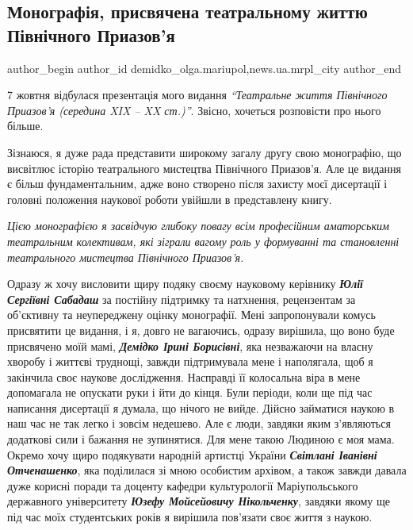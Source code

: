  
 
 
 
 
 
\subsection{Монографія, присвячена театральному життю Північного Приазов'я}
\label{sec:06_10_2021.stz.news.ua.mrpl_city.1.monografia}
 
\ifcmt
 author_begin
   author_id demidko_olga.mariupol,news.ua.mrpl_city
 author_end
\fi


7 жовтня відбулася презентація мого видання \emph{\enquote{Театральне життя Північного
Приазов'я (середина XIX – XX ст.)}}. Звісно, хочеться розповісти про нього
більше.

Зізнаюся, я дуже рада представити широкому загалу другу свою монографію, що
висвітлює історію театрального мистецтва Північного Приазов'я. Але це видання є
більш фундаментальним, адже воно створено після захисту моєї дисертації і
головні положення наукової роботи увійшли в представлену книгу.

\emph{Цією монографією я засвідчую глибоку повагу всім професійним  аматорським
театральним колективам, які зіграли вагому роль у формуванні та становленні
театрального мистецтва Північного Приазов'я.}

Одразу ж хочу висловити щиру подяку своєму науковому керівнику \emph{\textbf{Юлії Сергіївні
Сабадаш}} за постійну підтримку та натхнення, рецензентам за об'єктивну та
неупереджену оцінку монографії. Мені запропонували комусь присвятити це
видання, і я, довго не вагаючись, одразу вирішила, що воно буде присвячено моїй
мамі, \emph{\textbf{Демідко Ірині Борисівні}}, яка незважаючи на власну хворобу і життєві
труднощі, завжди підтримувала мене і наполягала, щоб я закінчила своє наукове
дослідження. Насправді її колосальна віра в мене допомагала не опускати руки і
йти до кінця. Були періоди, коли ще під час написання дисертації я думала, що
нічого не вийде. Дійсно займатися наукою в наш час не так легко і зовсім
недешево. Але є люди, завдяки яким з'являються додаткові сили і бажання не
зупинятися. Для мене такою Людиною є моя мама. Окремо хочу щиро подякувати
народній артистці України \emph{\textbf{Світлані Іванівні Отченашенко}}, яка поділилася зі мною
особистим архівом, а також завжди давала дуже корисні поради та доценту кафедри
культурології Маріупольського державного університету \emph{\textbf{Юзефу Мойсейовичу
Нікольченку}}, завдяки якому ще під час моїх студентських років я вирішила
пов'язати своє життя з наукою.

